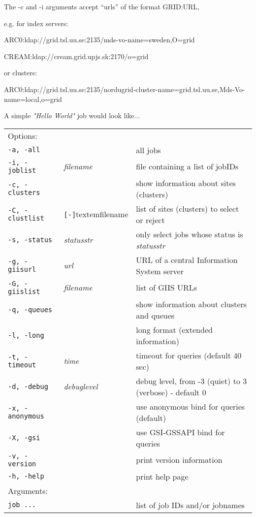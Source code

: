 \begin{framed}
The -c and -i arguments accept ``urls'' of the format GRID:URL,

e.g. for index servers:

ARC0:ldap://grid.tsl.uu.se:2135/mds-vo-name=sweden,O=grid

CREAM:ldap://cream.grid.upjs.sk:2170/o=grid

or clusters:

ARC0:ldap://grid.tsl.uu.se:2135/nordugrid-cluster-name=grid.tsl.uu.se,Mds-Vo-name=local,o=grid
\end{framed}

A simple \textit{"Hello World"} job would look like...

\begin{shaded}
\end{shaded}
\begin{longtable}{llp{8cm}}
   Options:&&\\
   \texttt{-a, -all}& & all jobs\\
   \texttt{-i, -joblist}& \textit{filename}& file containing a list of jobIDs\\
   \texttt{-c, -clusters}& & show information about sites (clusters)\\
   \texttt{-C, -clustlist}&\verb#[-]#textem{filename}&list of sites (clusters) to select or reject\\
   \texttt{-s, -status}& \textit{statusstr} &only select jobs whose status is \textit{statusstr}\\
   \texttt{-g, -giisurl}& \textit{url} &URL of a central Information System server\\
   \texttt{-G, -giislist}&\textit{filename}&list of GIIS URLs\\
   \texttt{-q, -queues}&&show information about clusters and queues\\
   \texttt{-l, -long}& & long format (extended information)\\
   \texttt{-t, -timeout}& \textit{time}& timeout for queries (default 40 sec)\\
   \texttt{-d, -debug}& \textit{debuglevel}&debug level, from -3 (quiet) to 3 (verbose) - default 0\\
   \texttt{-x, -anonymous}& &use anonymous bind for queries (default)\\
   \texttt{-X, -gsi}& & use GSI-GSSAPI bind for queries\\
   \texttt{-v, -version}& & print version information\\
   \texttt{-h, -help}& & print help page\\
   Arguments:&&\\
   \texttt{job ...} && list of job IDs and/or jobnames\\
\end{longtable}

